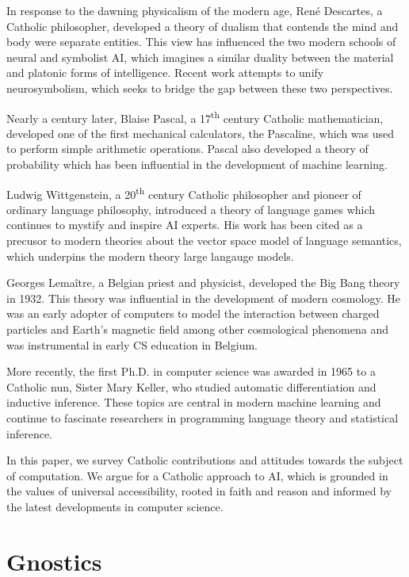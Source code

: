 \documentclass[sigplan,nonacm]{acmart}\settopmatter{printfolios=false,printccs=false,printacmref=false}
\begin{document}
  In response to the dawning physicalism of the modern age, Ren\'e Descartes, a Catholic philosopher, developed a theory of dualism that contends the mind and body were separate entities. This view has influenced the two modern schools of neural and symbolist AI, which imagines a similar duality between the material and platonic forms of intelligence. Recent work attempts to unify neurosymbolism, which seeks to bridge the gap between these two perspectives.

  Nearly a century later, Blaise Pascal, a 17\textsuperscript{th} century Catholic mathematician, developed one of the first mechanical calculators, the Pascaline, which was used to perform simple arithmetic operations. Pascal also developed a theory of probability which has been influential in the development of machine learning.

  Ludwig Wittgenstein, a 20\textsuperscript{th} century Catholic philosopher and pioneer of ordinary language philosophy, introduced a theory of language games which continues to mystify and inspire AI experts. His work has been cited as a precusor to modern theories about the vector space model of language semantics, which underpins the modern theory large langauge models.

  Georges Lema\^itre, a Belgian priest and physicist, developed the Big Bang theory in 1932. This theory was influential in the development of modern cosmology. He was an early adopter of computers to model the interaction between charged particles and Earth's magnetic field among other cosmological phenomena and was instrumental in early CS education in Belgium.

  More recently, the first Ph.D. in computer science was awarded in 1965 to a Catholic nun, Sister Mary Keller, who studied automatic differentiation and inductive inference. These topics are central in modern machine learning and continue to fascinate researchers in programming language theory and statistical inference.

  In this paper, we survey Catholic contributions and attitudes towards the subject of computation. We argue for a Catholic approach to AI, which is grounded in the values of universal accessibility, rooted in faith and reason and informed by the latest developments in computer science.

 \section{Gnostics}
\end{document}
